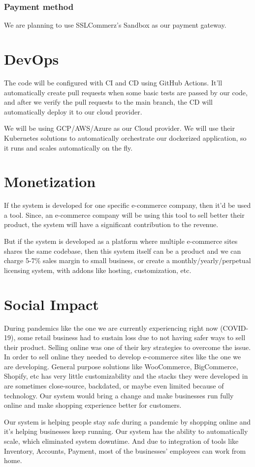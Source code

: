 \documentclass[12pt]{article}
\begin{document}
\subsubsection{Payment method}
We are planning to use SSLCommerz's Sandbox as our payment gateway.

\section{DevOps}
The code will be configured with CI and CD using GitHub Actions. It'll automatically create pull requests when some basic tests are passed by our code, and after we verify the pull requests to the main branch, the CD will automatically deploy it to our cloud provider. \par
We will be using GCP/AWS/Azure as our Cloud provider. We will use their Kubernetes solutions to automatically orchestrate our dockerized application, so it runs and scales automatically on the fly.

\section{Monetization}
If the system is developed for one specific e-commerce company, then it'd be used a tool. Since, an e-commerce company will be using this tool to sell better their product, the system will have a significant contribution to the revenue. \par
But if the system is developed as a platform where multiple e-commerce sites shares the same codebase, then this system itself can be a product and we can charge 5-7\% sales margin to small business, or create a monthly/yearly/perpetual licensing system, with addons like hosting, customization, etc.

\section{Social Impact}
During pandemics like the one we are currently experiencing right now (COVID-19), some retail business had to sustain loss due to not having safer ways to sell their product. Selling online was one of their key strategies to overcome the issue. In order to sell online they needed to develop e-commerce sites like the one we are developing. General purpose solutions like WooCommerce, BigCommerce, Shopify, etc has very little customizability and the stacks they were developed in are sometimes close-source, backdated, or maybe even limited because of technology. Our system would bring a change and make businesses run fully online and make shopping experience better for customers. \par

Our system is helping people stay safe during a pandemic by shopping online and it's helping businesses keep running. Our system has the ability to automatically scale, which eliminated system downtime. And due to integration of tools like Inventory, Accounts, Payment, most of the businesses' employees can work from home.
\end{document}
